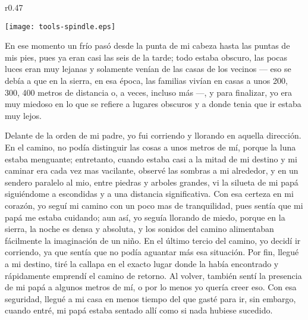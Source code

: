 \ifdefined\EnableIncludeImages
\begin{wrapfigure}{r}{0.47\textwidth}
  \begin{center}
  \vspace{-10pt}
    \texttt{[image: tools-spindle.eps]}
  \end{center}
  \vspace{-20pt}
\end{wrapfigure}
\fi
En ese momento un frío pasó desde la punta de mi cabeza hasta las puntas de mis pies, pues ya eran casi las seis de la tarde; todo estaba obscuro, las pocas luces eran muy lejanas y solamente venían de las casas de los vecinos --- eso se debía a que en la sierra, en esa época, las familias vivían en casas a unos 200, 300, 400 metros de distancia o, a veces, incluso más ---, y para finalizar, yo era muy miedoso en lo que se refiere a lugares obscuros y a donde tenia que ir estaba muy lejos.

Delante de la orden de mi padre, yo fui corriendo y llorando en aquella dirección. En el camino, no podía distinguir las cosas a unos metros de mí, porque la luna estaba menguante; entretanto, cuando estaba casi a la mitad de mi destino y mi caminar era cada vez mas vacilante, observé las sombras a mi alrededor, y en un sendero paralelo al mio, entre piedras y arboles grandes, vi la silueta de mi papá siguiéndome a escondidas y a una distancia significativa.
Con esa certeza en mi corazón, yo seguí mi camino con un poco mas de tranquilidad, pues sentía que mi papá me estaba cuidando; aun así, yo seguía llorando de miedo, porque en la sierra, la noche es densa y absoluta, y los sonidos del camino alimentaban fácilmente la imaginación de un niño.
En el último tercio del camino, yo decidí ir corriendo, ya que sentía que no podía aguantar más esa situación. Por fin, llegué a mi destino, tiré la callapa en el exacto lugar donde la había encontrado y rápidamente emprendí el camino de retorno.
Al volver, también sentí la presencia de mi papá a algunos metros de mí, o por lo menos yo quería creer eso. Con esa seguridad, llegué a mi casa en menos tiempo del que gasté para ir, sin embargo, cuando entré, mi papá estaba sentado allí como si nada hubiese sucedido.

